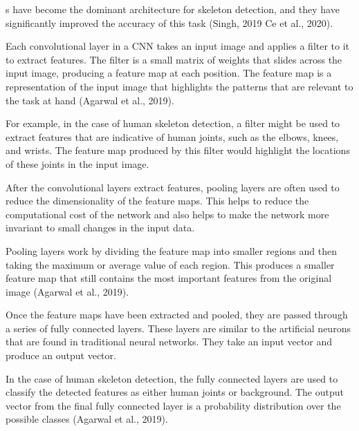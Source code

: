 \CNN\-s have become the dominant architecture for skeleton detection, and they have significantly improved the accuracy of this task (\scc Singh, 2019\; \scc Ce et al., 2020).


Each convolutional layer in a CNN takes an input image and applies a filter to it to extract features. The filter is a small matrix of weights that slides across the input image, producing a feature map at each position. The feature map is a representation of the input image that highlights the patterns that are relevant to the task at hand (\scc Agarwal et al., 2019).

For example, in the case of human skeleton detection, a filter might be used to extract features that are indicative of human joints, such as the elbows, knees, and wrists. The feature map produced by this filter would highlight the locations of these joints in the input image.


After the convolutional layers extract features, pooling layers are often used to reduce the dimensionality of the feature maps. This helps to reduce the computational cost of the network and also helps to make the network more invariant to small changes in the input data.

Pooling layers work by dividing the feature map into smaller regions and then taking the maximum or average value of each region. This produces a smaller feature map that still contains the most important features from the original image (\scc Agarwal et al., 2019).


Once the feature maps have been extracted and pooled, they are passed through a series of fully connected layers. These layers are similar to the artificial neurons that are found in traditional neural networks. They take an input vector and produce an output vector.

In the case of human skeleton detection, the fully connected layers are used to classify the detected features as either human joints or background. The output vector from the final fully connected layer is a probability distribution over the possible classes (\scc Agarwal et al., 2019).

